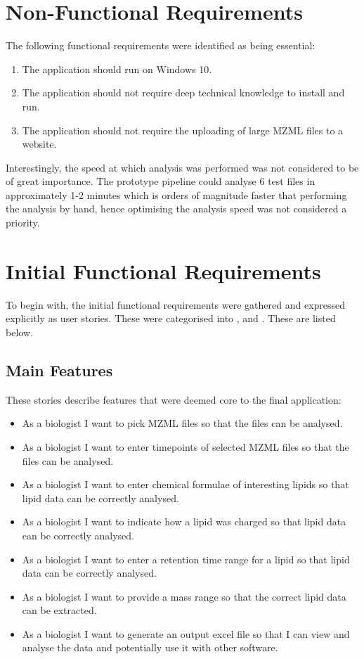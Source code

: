 \documentclass{l4proj}
\begin{document}
\section{Non-Functional Requirements} \label{key-requirements}
The following functional requirements were identified as being essential:
\begin{enumerate}
    \item The application should run on Windows 10.
    \item The application should not require deep technical knowledge to install and run.
    \item The application should not require the uploading of large MZML files to a website.
\end{enumerate}
Interestingly, the speed at which analysis was performed was not considered to be of great importance. The prototype pipeline could analyse 6 test files in approximately 1-2 minutes which is orders of magnitude faster that performing the analysis by hand, hence optimising the analysis speed was not considered a priority.

\section{Initial Functional Requirements}
To begin with, the initial functional requirements were gathered and expressed explicitly as user stories. These were categorised into ,  and . These are listed below.
\subsection{Main Features}
These stories describe features that were deemed core to the final application:
\begin{itemize}
    \item As a biologist I want to pick MZML files so that the files can be analysed.
    \item As a biologist I want to enter timepoints of selected MZML files so that the files can be analysed.
    \item As a biologist I want to enter chemical formulae of interesting lipids so that lipid data can be correctly analysed.
    \item As a biologist I want to indicate how a lipid was charged so that lipid data can be correctly analysed.
    \item As a biologist I want to enter a retention time range for a lipid so that lipid data can be correctly analysed.
    \item As a biologist I want to provide a mass range so that the correct lipid data can be extracted.
    \item As a biologist I want to generate an output excel file so that I can view and analyse the data and potentially use it with other software.
\end{itemize}
\end{document}
